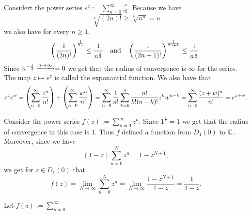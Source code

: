 \documentclass[11pt,a4paper]{article}
\begin{document}
\begin{example}
  Considert the power series $e^z := \sum_{n=0}^{\infty} \frac{z^n}{n!}$.
  Because we have
  \[
    \sqrt[n]{(2n)!} \geq \sqrt[n]{n^n} = n
  \]
  we also have for every $n \geq 1$,
  \[
    \del{\frac{1}{(2n)!}}^{\frac{1}{2n}} \le \frac{1}{n^{\half}}
    \tand
    \del{\frac{1}{(2n+1)!}}^{\frac{1}{2n+1}} \le \frac{1}{n^{\half}}.
  \]
  Since $n^{-\frac{1}{2}} \xrightarrow{n \to \infty} = 0$ we get that the radius of
  convergence is $\infty$ for the series.
  The map $z \mapsto e^z$ is called the exponantial function.
  We also have that
  \begin{align*}
    e^z e^w =
    \del{\sum_{n=0}^{\infty} \frac{z^n}{n!}} +
    \del{\sum_{n=0}^{\infty} \frac{w^n}{n!}} =
    \sum_{n=0}^{\infty}
    \frac{1}{n!} \sum_{k=0}^{n} \frac{n!}{k!(n-k)!} z^k w^{n-k} =
    \sum_{n=0}^{\infty} \frac{(z+w)^n}{n!} =
    e^{z + w}.
  \end{align*}
\end{example}

\begin{example}
  Consider the power series $f(z) := \sum_{n=0}^{\infty} z^n$.
  Since $1^{\frac 1n} = 1$ we get that the radius of convergence in
  this case is $1$.
  Thus $f$ defined a function from $D_1(0)$ to $\mathbb{C}$.
  Moreover, since we have
  \[
    (1 - z) \sum_{n=0}^{N} z^n = 1 - z^{N + 1},
  \]
  we get for $z \in D_1(0)$ that
  \[
    f(z) =
    \lim_{N \to \infty} \sum_{n=0}^{N} z^n =
    \lim_{N \to \infty} \frac{1 - z^{N + 1}}{1 - z} =
    \frac{1}{1 - z}.
  \]
\end{example}

\begin{proposition}
  Let $f(z) := \sum_{n=0}^{\infty} $
\end{proposition}
\end{document}
